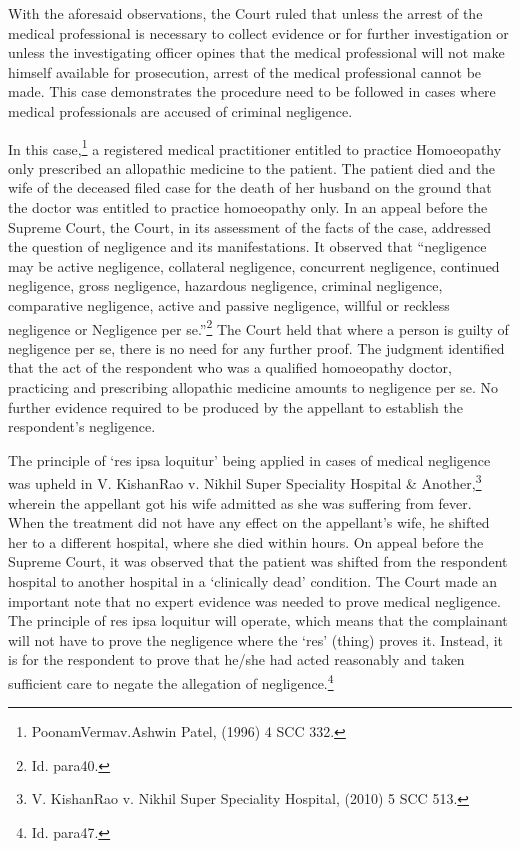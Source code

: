 \begin{multicols}{2}
\noi
With the aforesaid observations, the Court ruled that unless the arrest of the medical professional
is necessary to collect evidence or for further investigation or unless the investigating officer
opines that the medical professional will not make himself available for prosecution, arrest of the
medical professional cannot be made. This case demonstrates the procedure need to be followed
in cases where medical professionals are accused of criminal negligence.

\vspace{-.1cm}


\vspace{-.1cm}

\noi
In this case,\footnote{PoonamVermav.Ashwin Patel, (1996) 4 SCC 332.} a registered medical practitioner entitled to practice Homoeopathy only prescribed
an allopathic medicine to the patient. The patient died and the wife of the deceased filed case for
the death of her husband on the ground that the doctor was entitled to practice homoeopathy only.
In an appeal before the Supreme Court, the Court, in its assessment of the facts of the case,
addressed the question of negligence and its manifestations. It observed that “negligence may be
active negligence, collateral negligence, concurrent negligence, continued negligence, gross
negligence, hazardous negligence, criminal negligence, comparative negligence, active and
passive negligence, willful or reckless negligence or Negligence per se.”\footnote{Id. para40.} The Court held that
where a person is guilty of negligence per se, there is no need for any further proof. The judgment
identified that the act of the respondent who was a qualified homoeopathy doctor, practicing and
prescribing allopathic medicine amounts to negligence per se. No further evidence required to be
produced by the appellant to establish the respondent’s negligence.


\vspace{-.1cm}

\noi
The principle of ‘res ipsa loquitur’ being applied in cases of medical negligence was upheld in V.
KishanRao v. Nikhil Super Speciality Hospital \& Another,\footnote{V. KishanRao v. Nikhil Super Speciality Hospital, (2010) 5 SCC 513.} wherein the appellant got his wife
admitted as she was suffering from fever. When the treatment did not have any effect on the
appellant’s wife, he shifted her to a different hospital, where she died within hours. On appeal
before the Supreme Court, it was observed that the patient was shifted from the respondent
hospital to another hospital in a ‘clinically dead’ condition. The Court made an important note
that no expert evidence was needed to prove medical negligence. The principle of res ipsa loquitur
will operate, which means that the complainant will not have to prove the negligence where the
‘res’ (thing) proves it. Instead, it is for the respondent to prove that he/she had acted reasonably
and taken sufficient care to negate the allegation of negligence.\footnote{Id. para47.}


\end{multicols}
